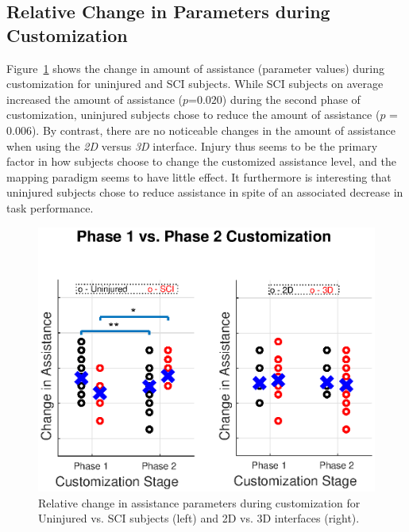 \documentclass[letterpaper, 10 pt, journal, twoside]{IEEEtran}  %
\begin{document}
	\subsection{Relative Change in Parameters during Customization} \label{RCPC}
	Figure~\ref{RCAP} shows the change in amount of assistance (parameter values) during customization for uninjured and SCI subjects. While SCI subjects on average increased the amount of assistance ($p$\;=\;$0.020$) during the second phase of customization, uninjured subjects chose to reduce the amount of assistance ($p$ = $0.006$). By contrast, there are no noticeable changes in the amount of assistance when using the \textit{2D} versus \textit{3D} interface. Injury thus seems to be the primary factor in how subjects choose to change the customized assistance level, and the mapping paradigm seems to have little effect. It furthermore is interesting that uninjured subjects chose to reduce assistance in spite of an associated decrease in task performance.
	\begin{figure}[t]
		\centering
		\includegraphics[scale=0.5]{./finalfigures/Figure6.eps}
		\vspace{-0.6cm}
		\caption{Relative change in assistance parameters during customization for Uninjured vs. SCI subjects (left) and 2D vs. 3D interfaces (right).}
		\label{RCAP}
	\end{figure}
\end{document}

